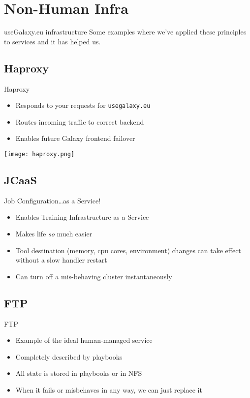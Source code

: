 \documentclass[12pt]{ufrslides}
\begin{document}
\section{Non-Human Infra}
\begin{frame}{useGalaxy.eu infrastructure}
	Some examples where we've applied these principles to services and it has helped us.
\end{frame}


\subsection{Haproxy}
\begin{frame}{Haproxy}
	\begin{itemize}
		\item Responds to your requests for \texttt{usegalaxy.eu}
		\item Routes incoming traffic to correct backend
		\item Enables future Galaxy frontend failover
	\end{itemize}
	\vfill
	\texttt{[image: haproxy.png]}
\end{frame}

\subsection{JCaaS}
\begin{frame}{Job Configuration\ldots{}as a Service!}
	\begin{itemize}
		\item Enables Training Infrastructure as a Service
		\item Makes life \emph{so} much easier
		\item Tool destination (memory, cpu cores, environment) changes can take effect without a slow handler restart
		\item Can turn off a mis-behaving cluster instantaneously
	\end{itemize}
\end{frame}

\subsection{FTP}
\begin{frame}{FTP}
	\begin{itemize}
		\item Example of the ideal human-managed service
		\item Completely described by playbooks
		\item All state is stored in playbooks or in NFS
		\item When it fails or misbehaves in any way, we can just replace it
	\end{itemize}
\end{frame}
\end{document}
